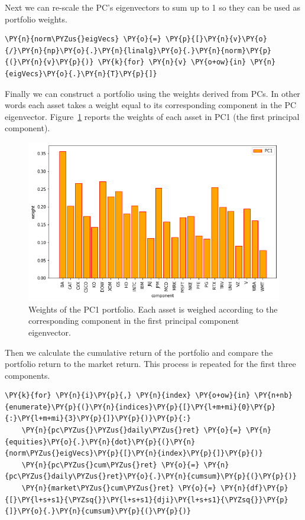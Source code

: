 Next we can re-scale the PC's eigenvectors to sum up to 1 so they can be
used as portfolio weights.
	
\begin{codebox}
\begin{Verbatim}[commandchars=\\\{\}]
\PY{n}{norm\PYZus{}eigVecs} \PY{o}{=} \PY{p}{[}\PY{n}{v}\PY{o}{/}\PY{n}{np}\PY{o}{.}\PY{n}{linalg}\PY{o}{.}\PY{n}{norm}\PY{p}{(}\PY{n}{v}\PY{p}{)} \PY{k}{for} \PY{n}{v} \PY{o+ow}{in} \PY{n}{eigVecs}\PY{o}{.}\PY{n}{T}\PY{p}{]}
\end{Verbatim}
\end{codebox}
	
Finally we can construct a portfolio using the weights derived from PCs.
In other words each asset takes a weight equal to its corresponding
component in the PC eigenvector. Figure~\ref{fig:pca_weights} reports
the weights of each asset in PC1 (the first principal component).
	
\begin{figure}[htb]
	\centering
	\includegraphics[width=.7\textwidth]{figures/portfolio_pca_pc1_weights}
	\caption{Weights of the PC1 portfolio. Each asset is weighed according
		to the corresponding component in the first principal component
		eigenvector.}
	\label{fig:pca_weights}
\end{figure}
	
Then we calculate the cumulative return of the portfolio and compare the
portfolio return to the market return. This process is repeated for the first three
components.

\begin{codebox}
\begin{Verbatim}[commandchars=\\\{\}]
\PY{k}{for} \PY{n}{i}\PY{p}{,} \PY{n}{index} \PY{o+ow}{in} \PY{n+nb}{enumerate}\PY{p}{(}\PY{n}{indices}\PY{p}{[}\PY{l+m+mi}{0}\PY{p}{:}\PY{l+m+mi}{3}\PY{p}{]}\PY{p}{)}\PY{p}{:}
    \PY{n}{pc\PYZus{}\PYZus{}daily\PYZus{}ret} \PY{o}{=} \PY{n}{equities}\PY{o}{.}\PY{n}{dot}\PY{p}{(}\PY{n}{norm\PYZus{}eigVecs}\PY{p}{[}\PY{n}{index}\PY{p}{]}\PY{p}{)}
    \PY{n}{pc\PYZus{}cum\PYZus{}ret} \PY{o}{=} \PY{n}{pc\PYZus{}daily\PYZus{}ret}\PY{o}{.}\PY{n}{cumsum}\PY{p}{(}\PY{p}{)}
    \PY{n}{market\PYZus{}cum\PYZus{}ret} \PY{o}{=} \PY{n}{df}\PY{p}{[}\PY{l+s+s1}{\PYZsq{}}\PY{l+s+s1}{dji}\PY{l+s+s1}{\PYZsq{}}\PY{p}{]}\PY{o}{.}\PY{n}{cumsum}\PY{p}{(}\PY{p}{)}
\end{Verbatim}
\end{codebox}
	
